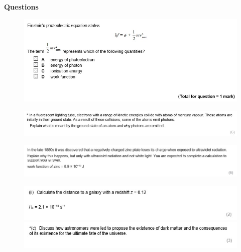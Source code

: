 \documentclass[12pt]{article}
\begin{document}
    {\Huge \textbf{Questions} \par}

    \begin{figure}[h]
        \includegraphics[width = \linewidth]{Question1.jpg}
    \end{figure}
    \begin{figure}[h]
        \includegraphics[width = \linewidth]{Question2.jpg}
    \end{figure}
    \begin{figure}[h]
        \includegraphics[width = \linewidth]{Question4.jpg}
    \end{figure}
    \begin{figure}[h]
        \includegraphics[width = \linewidth]{Question10.jpg}
        \includegraphics[width = \linewidth]{Question10P2.jpg}
    \end{figure}
\end{document}
